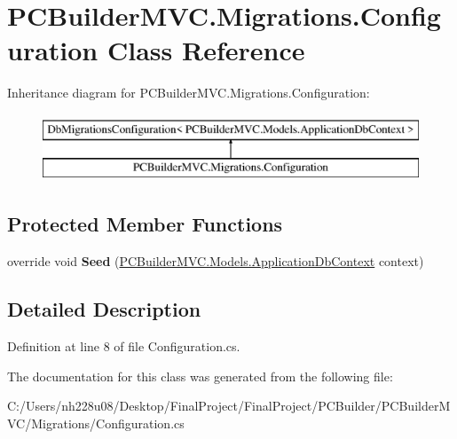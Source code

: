 \hypertarget{class_p_c_builder_m_v_c_1_1_migrations_1_1_configuration}{}\section{P\+C\+Builder\+M\+V\+C.\+Migrations.\+Configuration Class Reference}
\label{class_p_c_builder_m_v_c_1_1_migrations_1_1_configuration}
Inheritance diagram for P\+C\+Builder\+M\+V\+C.\+Migrations.\+Configuration\+:\begin{figure}[H]
\begin{center}
\leavevmode
\includegraphics[height=2.000000cm]{class_p_c_builder_m_v_c_1_1_migrations_1_1_configuration}
\end{center}
\end{figure}
\subsection*{Protected Member Functions}
\begin{DoxyCompactItemize}
\item 
override void {\bfseries Seed} (\hyperlink{class_p_c_builder_m_v_c_1_1_models_1_1_application_db_context}{P\+C\+Builder\+M\+V\+C.\+Models.\+Application\+Db\+Context} context)\hypertarget{class_p_c_builder_m_v_c_1_1_migrations_1_1_configuration_ad669e0355cf96be7e84635283b055309}{}\label{class_p_c_builder_m_v_c_1_1_migrations_1_1_configuration_ad669e0355cf96be7e84635283b055309}

\end{DoxyCompactItemize}


\subsection{Detailed Description}


Definition at line 8 of file Configuration.\+cs.



The documentation for this class was generated from the following file\+:\begin{DoxyCompactItemize}
\item 
C\+:/\+Users/nh228u08/\+Desktop/\+Final\+Project/\+Final\+Project/\+P\+C\+Builder/\+P\+C\+Builder\+M\+V\+C/\+Migrations/Configuration.\+cs\end{DoxyCompactItemize}
